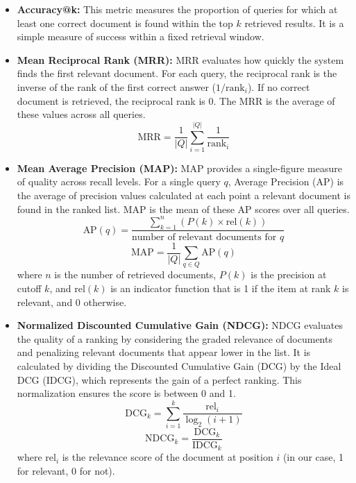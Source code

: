 \documentclass[acmsmall,screen,review]{acmart}
\begin{document}
\begin{itemize}
    \item \textbf{Accuracy@k:} This metric measures the proportion of queries for which at least one correct document is found within the top $k$ retrieved results. It is a simple measure of success within a fixed retrieval window.
    
    \item \textbf{Mean Reciprocal Rank (MRR):} MRR evaluates how quickly the system finds the first relevant document. For each query, the reciprocal rank is the inverse of the rank of the first correct answer ($1/\text{rank}_i$). If no correct document is retrieved, the reciprocal rank is 0. The MRR is the average of these values across all queries.
    \begin{equation}
        \text{MRR} = \frac{1}{|Q|} \sum_{i=1}^{|Q|} \frac{1}{\text{rank}_i}
    \end{equation}
    
    \item \textbf{Mean Average Precision (MAP):} MAP provides a single-figure measure of quality across recall levels. For a single query $q$, Average Precision (AP) is the average of precision values calculated at each point a relevant document is found in the ranked list. MAP is the mean of these AP scores over all queries.
    \begin{equation}
        \text{AP}(q) = \frac{\sum_{k=1}^{n} (P(k) \times \text{rel}(k))}{\text{number of relevant documents for } q}
    \end{equation}
    \begin{equation}
        \text{MAP} = \frac{1}{|Q|} \sum_{q \in Q} \text{AP}(q)
    \end{equation}
    where $n$ is the number of retrieved documents, $P(k)$ is the precision at cutoff $k$, and $\text{rel}(k)$ is an indicator function that is 1 if the item at rank $k$ is relevant, and 0 otherwise.

    \item \textbf{Normalized Discounted Cumulative Gain (NDCG):} NDCG evaluates the quality of a ranking by considering the graded relevance of documents and penalizing relevant documents that appear lower in the list. It is calculated by dividing the Discounted Cumulative Gain (DCG) by the Ideal DCG (IDCG), which represents the gain of a perfect ranking. This normalization ensures the score is between 0 and 1.
    \begin{equation}
        \text{DCG}_k = \sum_{i=1}^{k} \frac{\text{rel}_i}{\log_2(i+1)}
    \end{equation}
    \begin{equation}
        \text{NDCG}_k = \frac{\text{DCG}_k}{\text{IDCG}_k}
    \end{equation}
    where $\text{rel}_i$ is the relevance score of the document at position $i$ (in our case, 1 for relevant, 0 for not).
\end{itemize}
\end{document}
